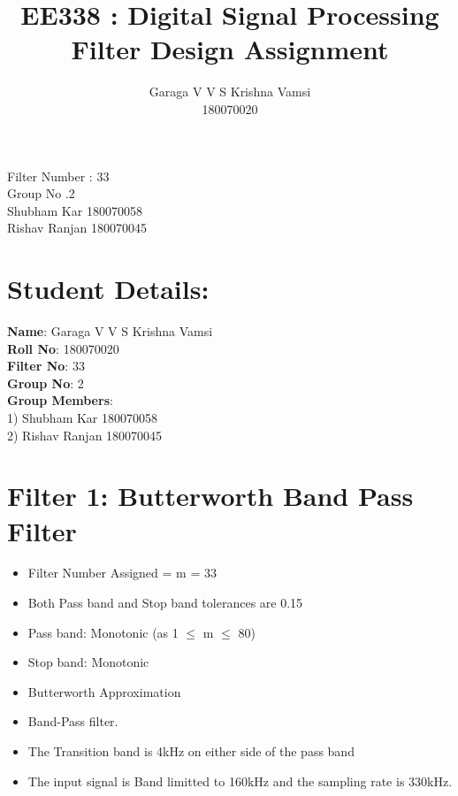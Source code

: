 \documentclass[12pt]{article}
\title{ \color{darkblue}  \textbf{EE338 : Digital Signal Processing \\
Filter Design Assignment}}
\author{ Garaga V V S Krishna Vamsi\\
180070020}
\begin{document}
	\doublespacing
	\maketitle
	\begin{center}
		Filter Number : 33\\
		Group No .2\\
		Shubham Kar 180070058\\
		Rishav Ranjan 180070045\\
	\end{center}
	
	
	\newpage	
	\color{darkblue}\tableofcontents
	\newpage
	\singlespacing
	\color{darkblue}
	\section{Student Details:}
	\color{black}
	\color{darkblue}\textbf{Name}\color{black}: Garaga V V S Krishna Vamsi\\
	\color{darkblue}\textbf{Roll No}\color{black}: 180070020\\
	\color{darkblue}\textbf{Filter No}\color{black}: 33\\
	\color{darkblue}\textbf{Group No}\color{black}: 2\\
	\color{darkblue}\textbf{Group Members}\color{black}:\\
	1) Shubham Kar 180070058\\
	2) Rishav Ranjan 180070045
	
	\color{darkblue}
	\section{Filter 1: Butterworth Band Pass Filter}
	\color{black}
	\begin{itemize}
		\item Filter Number Assigned = m = 33
		\item Both Pass band and Stop band tolerances are 0.15
		\item Pass band: Monotonic  (as 1 $\le$ m $\le$ 80)
		\item Stop band: Monotonic
		\item Butterworth Approximation
		\item Band-Pass filter.
		\item The Transition band is 4kHz on either side of the pass band
		\item The input signal is Band limitted to 160kHz and the sampling rate is 330kHz.
	\end{itemize}
	\color{cyan}
\end{document}
